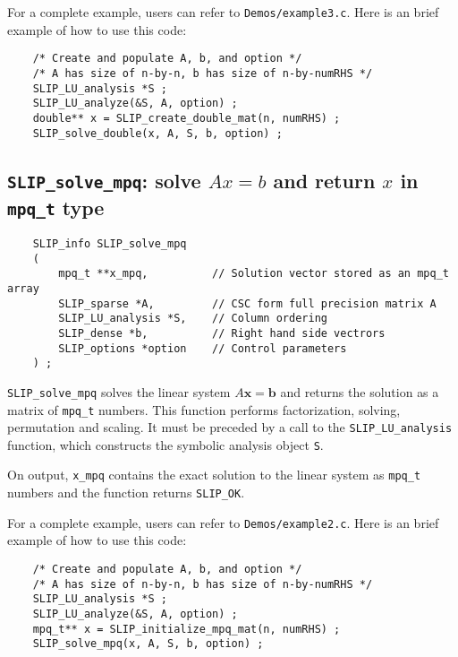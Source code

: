 \documentclass[12pt]{article}
\theoremstyle{definition}
\begin{document}
For a complete example, users can refer to \verb|Demos/example3.c|. Here is an
brief example of how to use this code:

{\small
\begin{verbatim}
    /* Create and populate A, b, and option */
    /* A has size of n-by-n, b has size of n-by-numRHS */
    SLIP_LU_analysis *S ;
    SLIP_LU_analyze(&S, A, option) ; 
    double** x = SLIP_create_double_mat(n, numRHS) ;
    SLIP_solve_double(x, A, S, b, option) ;
\end{verbatim}
}

\cprotect\subsection{\verb|SLIP_solve_mpq|: solve $Ax=b$ and return $x$ in \verb|mpq_t| type}
\label{ss:SLIP_solve_mpq}

\begin{mdframed}[userdefinedwidth=6in]
{\footnotesize
\begin{verbatim}
    SLIP_info SLIP_solve_mpq
    (
        mpq_t **x_mpq,          // Solution vector stored as an mpq_t array
        SLIP_sparse *A,         // CSC form full precision matrix A
        SLIP_LU_analysis *S,    // Column ordering
        SLIP_dense *b,          // Right hand side vectrors
        SLIP_options *option    // Control parameters
    ) ;
\end{verbatim}
} \end{mdframed}

\verb|SLIP_solve_mpq| solves the linear system $A\mathbf{x}=\mathbf{b}$ and
returns the solution as a matrix of \verb|mpq_t| numbers. This function
performs factorization, solving, permutation and scaling.  It must be preceded
by a call to the \verb|SLIP_LU_analysis| function, which constructs the
symbolic analysis object \verb|S|.

On output, \verb|x_mpq| contains the exact solution to the linear system
as \verb|mpq_t| numbers and the function returns \verb|SLIP_OK|.

For a complete example, users can refer to \verb|Demos/example2.c|. Here is an
brief example of how to use this code:

{\small
\begin{verbatim}
    /* Create and populate A, b, and option */
    /* A has size of n-by-n, b has size of n-by-numRHS */
    SLIP_LU_analysis *S ;
    SLIP_LU_analyze(&S, A, option) ;
    mpq_t** x = SLIP_initialize_mpq_mat(n, numRHS) ;
    SLIP_solve_mpq(x, A, S, b, option) ; \end{verbatim} }
\end{document}
